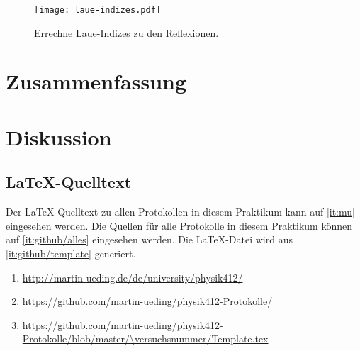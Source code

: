 \begin{figure}[htbp]
    \centering
    \texttt{[image: laue-indizes.pdf]}
    \caption{%
        Errechne Laue-Indizes zu den Reflexionen.
    }
    \label{fig:laue-indizes}
\end{figure}

\chapter{Zusammenfassung}

\chapter{Diskussion}


\FloatBarrier
\begin{appendix}
    \FloatBarrier
    \chapter{\LaTeX-Quelltext}

    Der \LaTeX-Quelltext zu allen Protokollen in diesem Praktikum kann auf
    \ref{it:mu} eingesehen werden. Die Quellen für alle Protokolle in diesem
    Praktikum können auf \ref{it:github/alles} eingesehen werden. Die
    \LaTeX-Datei wird aus \ref{it:github/template} generiert.

    \begin{enumerate}
        \item
            \label{it:mu}
            \url{http://martin-ueding.de/de/university/physik412/}
        \item
            \label{it:github/alles}
            \url{https://github.com/martin-ueding/physik412-Protokolle/}
        \item
            \label{it:github/template}
            \url{https://github.com/martin-ueding/physik412-Protokolle/blob/master/\versuchsnummer/Template.tex}
    \end{enumerate}
\end{appendix}


\FloatBarrier
\printbibliography



